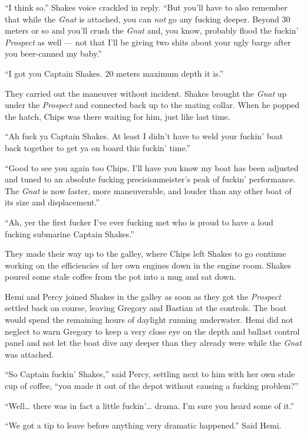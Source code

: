 \documentclass[]{scrbook}
\begin{document}
``I think so.'' Shakes voice crackled in reply. ``But you'll have to
also remember that while the \emph{Gnat} is attached, you can \emph{not}
go any fucking deeper. Beyond 30 meters or so and you'll crush the
\emph{Gnat} and, you know, probably flood the fuckin' \emph{Prospect} as
well --- not that I'll be giving two shits about your ugly barge after
you beer-canned my baby.''

``I got you Captain Shakes. 20 meters maximum depth it is.''

They carried out the maneuver without incident. Shakes brought the
\emph{Gnat} up under the \emph{Prospect} and connected back up to the
mating collar. When he popped the hatch, Chips was there waiting for
him, just like last time.

``Ah fuck ya Captain Shakes. At least I didn't have to weld your fuckin'
boat back together to get ya on board this fuckin' time.''

``Good to see you again too Chips. I'll have you know my boat has been
adjusted and tuned to an absolute fucking precisionmeister's peak of
fuckin' performance. The \emph{Gnat} is now faster, more maneuverable,
and louder than any other boat of its size and displacement.''

``Ah, yer the first fucker I've ever fucking met who is proud to have a
loud fucking submarine Captain Shakes.''

They made their way up to the galley, where Chips left Shakes to go
continue working on the efficiencies of her own engines down in the
engine room. Shakes poured some stale coffee from the pot into a mug and
sat down.

Hemi and Percy joined Shakes in the galley as soon as they got the
\emph{Prospect} settled back on course, leaving Gregory and Bastian at
the controls. The boat would spend the remaining hours of daylight
running underwater. Hemi did not neglect to warn Gregory to keep a very
close eye on the depth and ballast control panel and not let the boat
dive any deeper than they already were while the \emph{Gnat} was
attached.

``So Captain fuckin' Shakes,'' said Percy, settling next to him with her
own stale cup of coffee, ``you made it out of the depot without causing
a fucking problem?''

``Well\ldots{} there was in fact a little fuckin'\ldots{} drama. I'm
sure you heard some of it.''

``We got a tip to leave before anything very dramatic happened.'' Said
Hemi.
\end{document}
